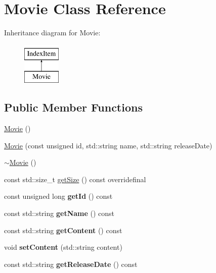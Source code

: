 \hypertarget{classMovie}{\section{Movie Class Reference}
\label{classMovie}
}
Inheritance diagram for Movie\-:\begin{figure}[H]
\begin{center}
\leavevmode
\includegraphics[height=2.000000cm]{classMovie}
\end{center}
\end{figure}
\subsection*{Public Member Functions}
\begin{DoxyCompactItemize}
\item 
\hyperlink{classMovie_a62d82e9e61d6349ae66a73d0af6667ac}{Movie} ()
\item 
\hyperlink{classMovie_abb2c17a81fa6460053dcc8780610d95d}{Movie} (const unsigned id, std\-::string name, std\-::string release\-Date)
\item 
\hyperlink{classMovie_abf1d82f3db5306141635e34cdb80273c}{$\sim$\-Movie} ()
\item 
const std\-::size\-\_\-t \hyperlink{classMovie_afce673c999fa4a8fb8c5f3f6ca687a69}{get\-Size} () const overridefinal
\item 
\hypertarget{classMovie_af5b558ff423403ff31eebdd35b284c89}{const unsigned long {\bfseries get\-Id} () const }\label{classMovie_af5b558ff423403ff31eebdd35b284c89}

\item 
\hypertarget{classMovie_ac3fc9da379ab28e8e516bbac56a97ba1}{const std\-::string {\bfseries get\-Name} () const }\label{classMovie_ac3fc9da379ab28e8e516bbac56a97ba1}

\item 
\hypertarget{classMovie_a877709e68215f6faadc2f26f664555d7}{const std\-::string {\bfseries get\-Content} () const }\label{classMovie_a877709e68215f6faadc2f26f664555d7}

\item 
\hypertarget{classMovie_a57864dc97783728c382b1025c93b6785}{void {\bfseries set\-Content} (std\-::string content)}\label{classMovie_a57864dc97783728c382b1025c93b6785}

\item 
\hypertarget{classMovie_afbbc81e4f1af1a5381cf338f2619d345}{const std\-::string {\bfseries get\-Release\-Date} () const }\label{classMovie_afbbc81e4f1af1a5381cf338f2619d345}

\end{DoxyCompactItemize}
